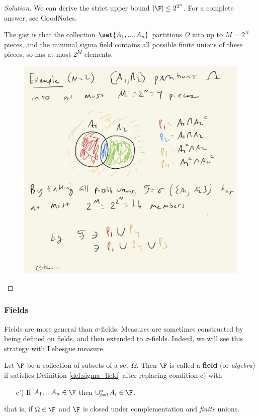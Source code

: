 \documentclass{article} %
\newcommand{\sfs}{$\sigma$-fields}
\begin{document}
\begin{proof}[Solution]
We can derive the strict upper bound $|\F| \leq 2^{2^n}$. For a complete answer, see GoodNotes. 	

The gist is that the collection $\set{A_1,...,A_n}$ partitions $\Omega$ into up to $M=2^N$ pieces, and the minimal sigma field contains all possible finite unions of these pieces, so has at most $2^{M}$ elements.
  
\begin{figure}[h!]
\centering 
\includegraphics[width=.7\textwidth]{images/minimal_sigma_fields}
\end{figure}

\end{proof}

\subsubsection{Fields}

Fields are more general than $\sigma$-fields.  Measures are sometimes constructed by being defined on fields, and then extended to \sfs.  Indeed, we will see this strategy with Lebesgue measure. 

\begin{definition}
Let $\F$ be a collection of subsets of a set $\Omega$.  Then $\F$ is called a \textbf{field} (or \textit{algebra})  if satisfies Definition \ref{def:sigma_field} after replacing condition c) with

\begin{enumerate}
	\item[c')] If $A_1,...A_n \in \F$ then $\cup_{i=1}^n A_i \in \F$.
\end{enumerate}
that is, if $\Omega \in \F$ and $\F$ is closed under complementation and \textit{finite} unions.
\label{def:field}	
\end{definition}
\end{document}
